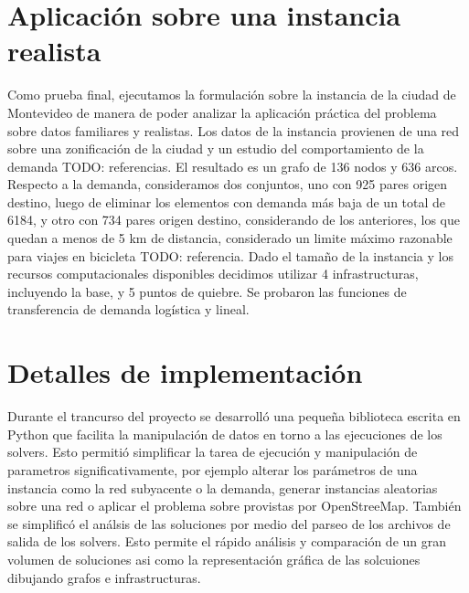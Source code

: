 \documentclass{article}
\begin{document}
  \section{Aplicación sobre una instancia realista}

  Como prueba final, ejecutamos la formulación sobre la instancia de la ciudad de Montevideo de manera de poder analizar la aplicación práctica del problema sobre datos familiares y realistas. Los datos de la instancia provienen de una red sobre una zonificación de la ciudad y un estudio del comportamiento de la demanda TODO: referencias. El resultado es un grafo de 136 nodos y 636 arcos. Respecto a la demanda, consideramos dos conjuntos, uno con 925 pares origen destino, luego de eliminar los elementos con demanda más baja de un total de 6184, y otro con 734 pares origen destino, considerando de los anteriores, los que quedan a menos de 5 km de distancia, considerado un limite máximo razonable para viajes en bicicleta TODO: referencia. Dado el tamaño de la instancia y los recursos computacionales disponibles decidimos utilizar 4 infrastructuras, incluyendo la base, y 5 puntos de quiebre. Se probaron las funciones de transferencia de demanda logística y lineal.



  \section{Detalles de implementación}

  Durante el trancurso del proyecto se desarrolló una pequeña biblioteca escrita en Python que facilita la manipulación de datos en torno a las ejecuciones de los solvers. Esto permitió simplificar la tarea de ejecución y manipulación de parametros significativamente, por ejemplo alterar los parámetros de una instancia como la red subyacente o la demanda, generar instancias aleatorias sobre una red o aplicar el problema sobre provistas por OpenStreeMap. También se simplificó el análsis de las soluciones por medio del parseo de los archivos de salida de los solvers. Esto permite el rápido análisis y comparación de un gran volumen de soluciones asi como la representación gráfica de las solcuiones dibujando grafos e infrastructuras.
\end{document}
